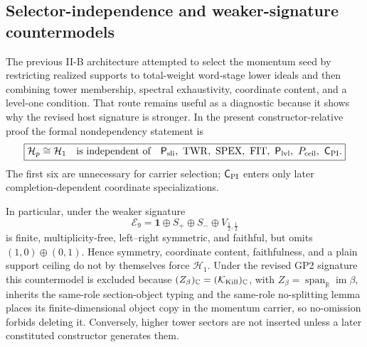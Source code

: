 \documentclass[11pt,a4paper]{article}
\begin{document}
\begin{table}[ht]
\caption[Compact spherical carrier selection]{Compact spherical carrier selection.}
\endgroup
\end{table}

\subsection{Selector-independence and weaker-signature countermodels}
\label{p2b:app:legacy-selector}
The previous II-B architecture attempted to select the momentum seed by
restricting realized supports to total-weight word-stage lower ideals and then
combining tower membership, spectral exhaustivity, coordinate content, and a
level-one condition.  That route remains useful as a diagnostic because it
shows why the revised host signature is stronger.  In the present
constructor-relative proof the formal nondependency statement is
\[
 \boxed{
 \mathcal H_p\cong\mathcal H_1
 \quad\text{is independent of}\quad
 \mathsf P_{\rm sli},\ \mathrm{TWR},\ \mathrm{SPEX},\ \mathrm{FIT},\
 \mathsf P_{\rm lvl},\ P_{\rm ceil},\ \mathsf C_{\rm PI}.}
\]
The first six are unnecessary for carrier selection; \(\mathsf C_{\rm PI}\)
enters only later completion-dependent coordinate specializations.

In particular, under the weaker signature
\[
 \mathcal E_9
 =\mathbf1\oplus S_+\oplus S_-\oplus V_{\frac12,\frac12}
\]
is finite, multiplicity-free, left--right symmetric, and faithful, but omits
\((1,0)\oplus(0,1)\).  Hence symmetry, coordinate content, faithfulness, and a
plain support ceiling do not by themselves force \(\mathcal H_1\).  Under the
revised GP2 signature this countermodel is excluded because
\((Z_\beta)_{\mathbb C}=(\mathcal K_{\rm Kill})_{\mathbb C}\), with
\(Z_\beta=\operatorname{span}_{\mathbb R}\operatorname{im}\beta\), inherits
the same-role section-object typing and the same-role no-splitting lemma places
its finite-dimensional object copy in the momentum carrier, so no-omission
forbids deleting it.  Conversely, higher tower sectors
are not inserted unless a later constituted constructor generates them.
\end{document}
